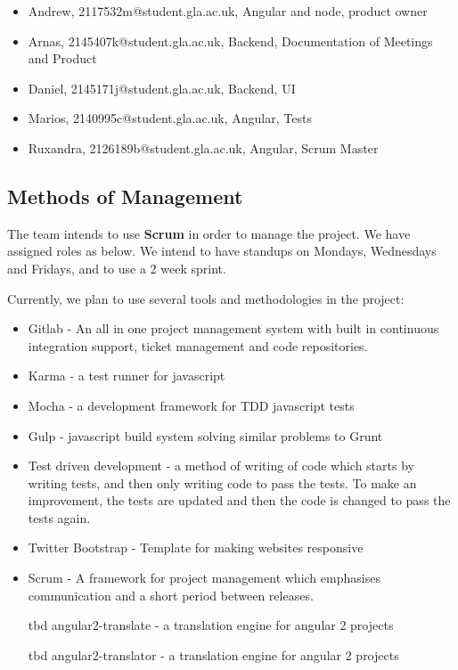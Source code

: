 \documentclass[10pt,a4paper]{article}
\begin{document}
\begin{itemize}

\item
Andrew, 2117532m@student.gla.ac.uk, Angular and node, product owner
\item
Arnas, 2145407k@student.gla.ac.uk, Backend, Documentation of Meetings and Product
\item
Daniel, 2145171j@student.gla.ac.uk, Backend, UI
\item
Marios, 2140995c@student.gla.ac.uk, Angular, Tests
\item
Ruxandra, 2126189b@student.gla.ac.uk, Angular, Scrum Master

\end{itemize}

\subsection{Methods of Management}
The team intends to use \textbf{Scrum} in order to manage the project. We have assigned roles as below. We intend to have standups on Mondays, Wednesdays and Fridays, and to use a 2 week sprint.



Currently, we plan to use several tools and methodologies in the project:
\begin{itemize}

\item
Gitlab - An all in one project management system with built in continuous integration support, ticket management and code repositories. 

\item 
Karma - a test runner for javascript

\item
Mocha - a development framework for TDD javascript tests

\item
Gulp - javascript build system solving similar problems to Grunt

\item
Test driven development - a method of writing of code which starts by writing tests, and then only writing code to pass the tests. To make an improvement, the tests are updated and then the code is changed to pass the tests again.

\item
Twitter Bootstrap - Template for making websites responsive

\item
Scrum - A framework for project management which emphasises communication and a short period between releases.


\item 
[tbd] angular2-translate - a translation engine for angular 2 projects

\item 
[tbd] angular2-translator - a translation engine for angular 2 projects
\end{itemize}
\end{document}
